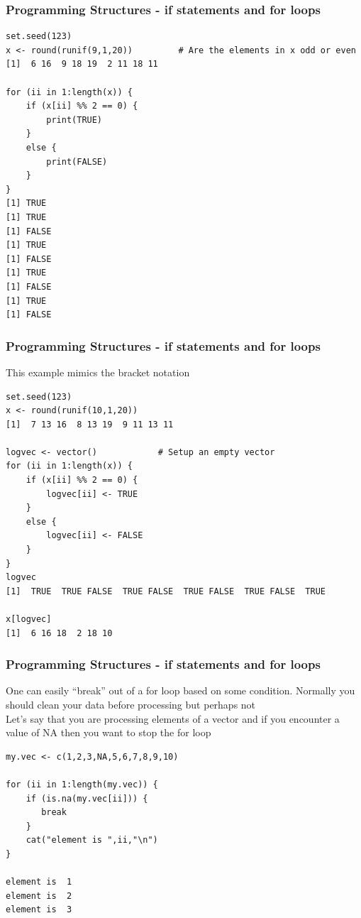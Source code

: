 \documentclass{beamer}
\begin{document}
%

\begin{frame}[fragile]
\frametitle{Programming Structures - if statements and for loops}
\footnotesize
\begin{verbatim}
set.seed(123)
x <- round(runif(9,1,20))         # Are the elements in x odd or even
[1]  6 16  9 18 19  2 11 18 11

for (ii in 1:length(x)) {
    if (x[ii] %% 2 == 0) {
        print(TRUE)
    }
    else {
        print(FALSE)
    }
}
[1] TRUE
[1] TRUE
[1] FALSE
[1] TRUE
[1] FALSE
[1] TRUE
[1] FALSE
[1] TRUE
[1] FALSE
\end{verbatim}
\end{frame}


%

\begin{frame}[fragile]
\frametitle{Programming Structures - if statements and for loops}
This example mimics the bracket notation 
\footnotesize
\begin{verbatim}
set.seed(123)
x <- round(runif(10,1,20))
[1]  7 13 16  8 13 19  9 11 13 11

logvec <- vector()            # Setup an empty vector
for (ii in 1:length(x)) {
    if (x[ii] %% 2 == 0) {
        logvec[ii] <- TRUE
    }
    else {
        logvec[ii] <- FALSE
    }
}
logvec
[1]  TRUE  TRUE FALSE  TRUE FALSE  TRUE FALSE  TRUE FALSE  TRUE

x[logvec]
[1]  6 16 18  2 18 10
\end{verbatim}
\end{frame}

%

\begin{frame}[fragile]
\frametitle{Programming Structures - if statements and for loops}
One can easily ``break'' out of a for loop based on some condition. Normally you should clean your data before processing but perhaps not 
\newline
\\
Let's say that you are processing elements of a vector and if you encounter a value of NA then you want to stop the for loop
\footnotesize
\begin{verbatim}
my.vec <- c(1,2,3,NA,5,6,7,8,9,10)

for (ii in 1:length(my.vec)) {
    if (is.na(my.vec[ii])) {
       break
    }
    cat("element is ",ii,"\n")
}

element is  1 
element is  2 
element is  3 
\end{verbatim}
\end{frame}
\end{document}
